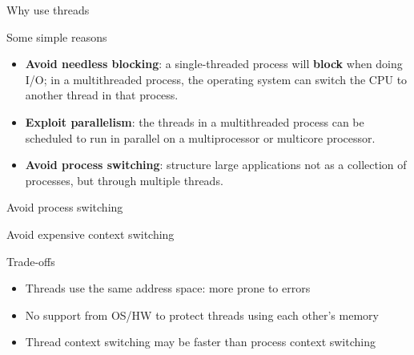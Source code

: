 \begin{frame}{Why use threads}
  \begin{block}{Some simple reasons}
    \begin{itemize}
      \item \textbf{Avoid needless blocking}: a single-threaded process will \textbf{block} when doing I/O; in a
            multithreaded process, the operating system can switch the CPU to another thread in that process.
      \item \textbf{Exploit parallelism}: the threads in a multithreaded process can be scheduled to run in
            parallel on a multiprocessor or multicore processor.
      \item \textbf{Avoid process switching}: structure large applications not as a collection of processes, but
            through multiple threads.
    \end{itemize}
  \end{block}
\end{frame}
\begin{frame}{Avoid process switching}
  \begin{block}{Avoid expensive context switching}
    \begin{centerfig}
    \end{centerfig}
  \end{block}
  \begin{block}{Trade-offs}
    \begin{itemize}
      \item Threads use the same address space: more prone to errors
      \item No support from OS/HW to protect threads using each other's memory
      \item Thread context switching may be faster than process context switching
    \end{itemize}
  \end{block}
\end{frame}
